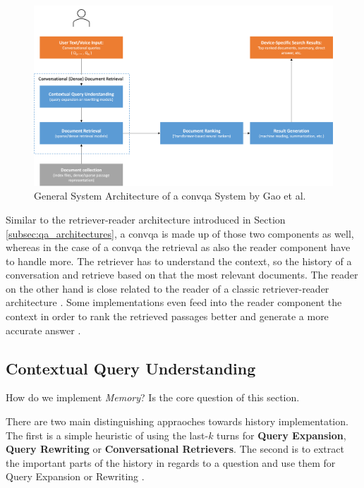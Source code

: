 \begin{figure}
    \centering
    \includegraphics[width=\textwidth]{Grafiken/System_Architecture_ConQA.png}
    \caption{General System Architecture of a \gls{convqa} System by Gao et al. \cite{gao_neural_2022}}
    \label{fig:convqa_system_architecture}
\end{figure}

Similar to the retriever-reader architecture introduced in Section \ref{subsec:qa_architectures}, a \gls{convqa} is made up of those two components as well, whereas in the case of a \gls{convqa} the retrieval as also the reader component have to handle more. The retriever has to understand the context, so the history of a conversation and retrieve based on that the most relevant documents. The reader on the other hand is close related to the reader of a classic retriever-reader architecture \cite{zamani_conversational_2023,gao_neural_2022}. Some implementations even feed into the reader component the context in order to rank the retrieved passages better and generate a more accurate answer \cite{owoicho_trec_2022}.

\subsection{Contextual Query Understanding}
\label{subsec:cqa_contextual_query_understanding}

How do we implement \textit{Memory}? Is the core question of this section. 

There are two main distinguishing appraoches towards history implementation. The first is a simple heuristic of using the last-$k$ turns for \textbf{Query Expansion}, \textbf{Query Rewriting} or \textbf{Conversational Retrievers}. The second is to extract the important parts of the history in regards to a question and use them for Query Expansion or Rewriting \cite{gao_neural_2022}.

